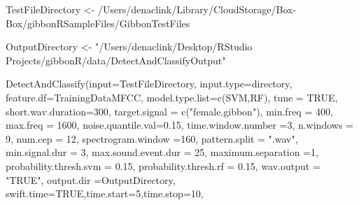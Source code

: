 \documentclass[
]{book}
\newenvironment{Shaded}{\begin{snugshade}}{\end{snugshade}}
\newcommand{\AttributeTok}[1]{\textcolor[rgb]{0.77,0.63,0.00}{#1}}
\newcommand{\ConstantTok}[1]{\textcolor[rgb]{0.00,0.00,0.00}{#1}}
\newcommand{\DecValTok}[1]{\textcolor[rgb]{0.00,0.00,0.81}{#1}}
\newcommand{\FloatTok}[1]{\textcolor[rgb]{0.00,0.00,0.81}{#1}}
\newcommand{\FunctionTok}[1]{\textcolor[rgb]{0.00,0.00,0.00}{#1}}
\newcommand{\NormalTok}[1]{#1}
\newcommand{\OtherTok}[1]{\textcolor[rgb]{0.56,0.35,0.01}{#1}}
\newcommand{\StringTok}[1]{\textcolor[rgb]{0.31,0.60,0.02}{#1}}
\begin{document}
\begin{Shaded}
\begin{Highlighting}[]

\NormalTok{  TestFileDirectory }\OtherTok{\textless{}{-}} \StringTok{\textquotesingle{}/Users/denaclink/Library/CloudStorage/Box{-}Box/gibbonRSampleFiles/GibbonTestFiles\textquotesingle{}}
  
\NormalTok{  OutputDirectory }\OtherTok{\textless{}{-}}  \StringTok{"/Users/denaclink/Desktop/RStudio Projects/gibbonR/data/DetectAndClassifyOutput"}
  
  \FunctionTok{DetectAndClassify}\NormalTok{(}\AttributeTok{input=}\NormalTok{TestFileDirectory,}
                    \AttributeTok{input.type=}\StringTok{\textquotesingle{}directory\textquotesingle{}}\NormalTok{,}
                    \AttributeTok{feature.df=}\NormalTok{TrainingDataMFCC,}
                    \AttributeTok{model.type.list=}\FunctionTok{c}\NormalTok{(}\StringTok{\textquotesingle{}SVM\textquotesingle{}}\NormalTok{,}\StringTok{\textquotesingle{}RF\textquotesingle{}}\NormalTok{),}
                    \AttributeTok{tune =} \ConstantTok{TRUE}\NormalTok{,}
                    \AttributeTok{short.wav.duration=}\DecValTok{300}\NormalTok{,}
                    \AttributeTok{target.signal =} \FunctionTok{c}\NormalTok{(}\StringTok{"female.gibbon"}\NormalTok{),}
                    \AttributeTok{min.freq =} \DecValTok{400}\NormalTok{, }\AttributeTok{max.freq =} \DecValTok{1600}\NormalTok{,}
                    \AttributeTok{noise.quantile.val=}\FloatTok{0.15}\NormalTok{,}
                    \AttributeTok{time.window.number =}\DecValTok{3}\NormalTok{,}
                    \AttributeTok{n.windows =} \DecValTok{9}\NormalTok{, }\AttributeTok{num.cep =} \DecValTok{12}\NormalTok{,}
                    \AttributeTok{spectrogram.window =}\DecValTok{160}\NormalTok{,}
                    \AttributeTok{pattern.split =} \StringTok{".wav"}\NormalTok{,}
                    \AttributeTok{min.signal.dur =} \DecValTok{3}\NormalTok{,}
                    \AttributeTok{max.sound.event.dur =} \DecValTok{25}\NormalTok{,}
                    \AttributeTok{maximum.separation =}\DecValTok{1}\NormalTok{,}
                    \AttributeTok{probability.thresh.svm =} \FloatTok{0.15}\NormalTok{,}
                    \AttributeTok{probability.thresh.rf =} \FloatTok{0.15}\NormalTok{,}
                    \AttributeTok{wav.output =} \StringTok{"TRUE"}\NormalTok{,}
                    \AttributeTok{output.dir =}\NormalTok{OutputDirectory,}
                    \AttributeTok{swift.time=}\ConstantTok{TRUE}\NormalTok{,}\AttributeTok{time.start=}\DecValTok{5}\NormalTok{,}\AttributeTok{time.stop=}\DecValTok{10}\NormalTok{,}

\end{Highlighting}
\end{Shaded}
\end{document}
